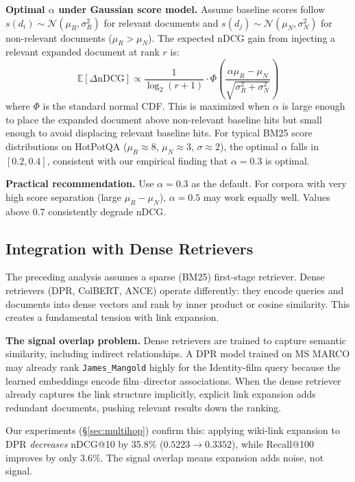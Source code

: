 \documentclass[sigconf,review]{acmart}
\begin{document}
\textbf{Optimal $\alpha$ under Gaussian score model.}
Assume baseline scores follow $s(d_i) \sim \mathcal{N}(\mu_R, \sigma_R^2)$
for relevant documents and $s(d_j) \sim \mathcal{N}(\mu_N, \sigma_N^2)$
for non-relevant documents ($\mu_R > \mu_N$).  The expected nDCG gain
from injecting a relevant expanded document at rank $r$ is:
\[
  \mathbb{E}[\Delta\text{nDCG}] \propto \frac{1}{\log_2(r+1)} \cdot \Phi\left(\frac{\alpha\mu_R - \mu_N}{\sqrt{\sigma_R^2 + \sigma_N^2}}\right)
\]
where $\Phi$ is the standard normal CDF.  This is maximized when
$\alpha$ is large enough to place the expanded document above
non-relevant baseline hits but small enough to avoid displacing
relevant baseline hits.  For typical BM25 score distributions on
HotPotQA ($\mu_R \approx 8$, $\mu_N \approx 3$, $\sigma \approx 2$),
the optimal $\alpha$ falls in $[0.2, 0.4]$, consistent with our
empirical finding that $\alpha = 0.3$ is optimal.

\textbf{Practical recommendation.}
Use $\alpha = 0.3$ as the default.  For corpora with very high score
separation (large $\mu_R - \mu_N$), $\alpha = 0.5$ may work equally
well.  Values above 0.7 consistently degrade nDCG.

\subsection{Integration with Dense Retrievers}
\label{sec:dense_integration}

The preceding analysis assumes a sparse (BM25) first-stage retriever.
Dense retrievers (DPR, ColBERT, ANCE) operate differently: they encode
queries and documents into dense vectors and rank by inner product or
cosine similarity.  This creates a fundamental tension with link
expansion.

\textbf{The signal overlap problem.}
Dense retrievers are trained to capture semantic similarity, including
indirect relationships.  A DPR model trained on MS MARCO may already
rank \texttt{James\_Mangold} highly for the Identity-film query because
the learned embeddings encode film--director associations.  When the
dense retriever already captures the link structure implicitly,
explicit link expansion adds redundant documents, pushing relevant
results down the ranking.

Our experiments (\S\ref{sec:multihop}) confirm this: applying wiki-link
expansion to DPR \emph{decreases} nDCG@10 by 35.8\%
($0.5223 \to 0.3352$), while Recall@100 improves by only 3.6\%.
The signal overlap means expansion adds noise, not signal.
\end{document}
